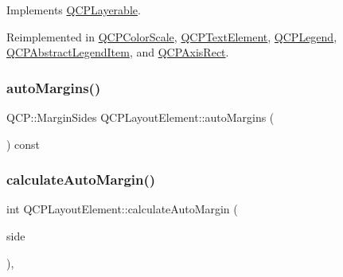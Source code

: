 Implements \mbox{\hyperlink{class_q_c_p_layerable_afdf83ddc6a265cbf4c89fe99d3d93473}{Q\+C\+P\+Layerable}}.



Reimplemented in \mbox{\hyperlink{class_q_c_p_color_scale_af1b24d24a70f25b65d29f09e413390a8}{Q\+C\+P\+Color\+Scale}}, \mbox{\hyperlink{class_q_c_p_text_element_a91f2e4b4a639d9079e89a0030c7ed352}{Q\+C\+P\+Text\+Element}}, \mbox{\hyperlink{class_q_c_p_legend_a817f75c234f82a2e26643dc0de742095}{Q\+C\+P\+Legend}}, \mbox{\hyperlink{class_q_c_p_abstract_legend_item_a6bfbcb9ace779f4f6fe22241c32a67c9}{Q\+C\+P\+Abstract\+Legend\+Item}}, and \mbox{\hyperlink{class_q_c_p_axis_rect_a4a318008e2b7f881a14c3d97186b31f9}{Q\+C\+P\+Axis\+Rect}}.

\mbox{\label{class_q_c_p_layout_element_a2585bc8c5cc70ee712909751a2fc8909}} 
\subsubsection{\texorpdfstring{autoMargins()}{autoMargins()}}
{\footnotesize\ttfamily Q\+C\+P\+::\+Margin\+Sides Q\+C\+P\+Layout\+Element\+::auto\+Margins (\begin{DoxyParamCaption}{ }\end{DoxyParamCaption}) const\hspace{0.3cm}{\ttfamily [inline]}}

\mbox{\label{class_q_c_p_layout_element_a005c9f0fe84bc1591a2cf2c46fd477b4}} 
\subsubsection{\texorpdfstring{calculateAutoMargin()}{calculateAutoMargin()}}
{\footnotesize\ttfamily int Q\+C\+P\+Layout\+Element\+::calculate\+Auto\+Margin (\begin{DoxyParamCaption}\item[{\mbox{\hyperlink{namespace_q_c_p_a7e487e3e2ccb62ab7771065bab7cae54}{Q\+C\+P\+::\+Margin\+Side}}}]{side }\end{DoxyParamCaption})\hspace{0.3cm}{\ttfamily [protected]}, {\ttfamily [virtual]}}




